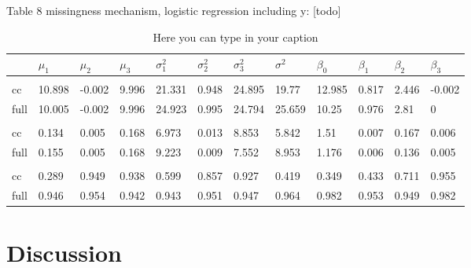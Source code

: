 \documentclass[
  twocolumn]{article}
\begin{document}
Table 8 missingness mechanism, logistic regression including y:
{[}todo{]}

\begin{table*}[bp]
\caption{Here you can type in your caption}
\begingroup\fontsize{7}{9}\selectfont

\begin{tabu} to 
\toprule
 & $\mu_1$ & $\mu_2$ & $\mu_3$ & $\sigma^2_1$ & $\sigma^2_2$ & $\sigma^2_3$ & $\sigma^2$ & $\beta_0$ & $\beta_1$ & $\beta_2$ & $\beta_3$\\
\midrule
\addlinespace[0.3em]
\\
\hspace{1em}cc & 10.898 & -0.002 & 9.996 & 21.331 & 0.948 & 24.895 & 19.77 & 12.985 & 0.817 & 2.446 & -0.002\\
\hspace{1em}full & 10.005 & -0.002 & 9.996 & 24.923 & 0.995 & 24.794 & 25.659 & 10.25 & 0.976 & 2.81 & 0\\
\addlinespace[0.3em]
\\
\hspace{1em}cc & 0.134 & 0.005 & 0.168 & 6.973 & 0.013 & 8.853 & 5.842 & 1.51 & 0.007 & 0.167 & 0.006\\
\hspace{1em}full & 0.155 & 0.005 & 0.168 & 9.223 & 0.009 & 7.552 & 8.953 & 1.176 & 0.006 & 0.136 & 0.005\\
\addlinespace[0.3em]
\\
\hspace{1em}cc & 0.289 & 0.949 & 0.938 & 0.599 & 0.857 & 0.927 & 0.419 & 0.349 & 0.433 & 0.711 & 0.955\\
\hspace{1em}full & 0.946 & 0.954 & 0.942 & 0.943 & 0.951 & 0.947 & 0.964 & 0.982 & 0.953 & 0.949 & 0.982\\
\bottomrule
\end{tabu}
\endgroup{}
\end{table*}

\hypertarget{discussion}{%
\section{Discussion}\label{discussion}}
\end{document}
